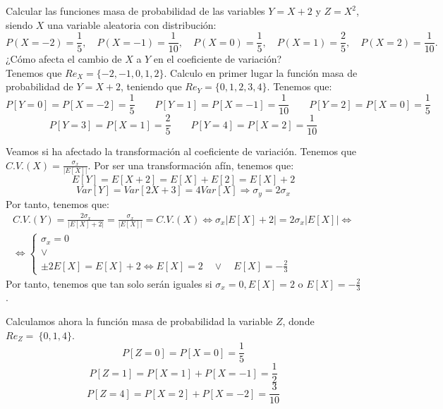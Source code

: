 \begin{ejercicio}
    Calcular las funciones masa de probabilidad de las variables $Y = X + 2$ y $Z = X^2$, siendo $X$ una variable aleatoria con distribución:
    \begin{equation*}
        P(X=-2)=\frac{1}{5},\quad P(X=-1)=\frac{1}{10},\quad P(X=0)=\frac{1}{5}, \quad P(X=1)=\frac{2}{5}, \quad P(X=2)=\frac{1}{10}.
    \end{equation*}
    ¿Cómo afecta el cambio de $X$ a $Y$ en el coeficiente de variación?\\
    Tenemos que $Re_X=\{-2,-1,0,1,2\}$. Calculo en primer lugar la función masa de probabilidad de $Y=X+2$, teniendo que $Re_Y=\{0,1,2,3,4\}$. Tenemos que:
    \begin{equation*}
        P[Y=0]=P[X=-2]=\frac{1}{5}
        \qquad
        P[Y=1]=P[X=-1]=\frac{1}{10}
        \qquad
        P[Y=2]=P[X=0]=\frac{1}{5}
    \end{equation*}
    \begin{equation*}
        P[Y=3]=P[X=1]=\frac{2}{5}
        \qquad
        P[Y=4]=P[X=2]=\frac{1}{10}
    \end{equation*}

    Veamos si ha afectado la transformación al coeficiente de variación. Tenemos que $\displaystyle C.V.(X)=\frac{\sigma_x}{|E[X]|}$. Por ser una transformación afín, tenemos que:
    \begin{equation*}
       E[Y]=E[X+2]=E[X]+E[2]=E[X]+2
    \end{equation*}
    \begin{equation*}
        Var[Y]=Var[2X+3]=4Var[X] \Longrightarrow \sigma_y = 2\sigma_x
    \end{equation*}
    Por tanto, tenemos que:
    \begin{multline*}
        C.V.(Y)=\frac{2\sigma_x}{|E[X]+2|} =\frac{\sigma_x}{|E[X]|}=C.V.(X)
        \Longleftrightarrow
        \sigma_x|E[X]+2| = 2\sigma_x|E[X]| \Longleftrightarrow \\ \Longleftrightarrow
        \left\{\begin{array}{c}
            \sigma_x=0 \\
             \lor \\
             \pm 2E[X]=E[X]+2 \Longleftrightarrow E[X]=2 \quad \lor \quad E[X]=-\frac{2}{3}
        \end{array}\right.
    \end{multline*}
    Por tanto, tenemos que tan solo serán iguales si $\sigma_x=0, E[X]=2$ o $E[X]=-\frac{2}{3}$.

    \vspace{1cm} Calculamos ahora la función masa de probabilidad la variable $Z$, donde $Re_Z=~\{0, 1, 4\}$.
    \begin{equation*}
        P[Z=0]=P[X=0]=\frac{1}{5}
    \end{equation*}
    \begin{equation*}
        P[Z=1]=P[X=1]+P[X=-1]=\frac{1}{2}
    \end{equation*}
    \begin{equation*}
        P[Z=4]=P[X=2]+P[X=-2]=\frac{3}{10}
    \end{equation*}
\end{ejercicio}

